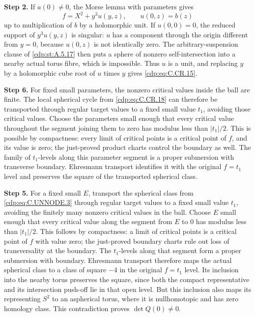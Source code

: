 \noindent\textbf{Step 2.} If $a(0)\ne0$, the Morse lemma with parameters gives
\[
 f=X^2+y^3u(y,z),\qquad u(0,z)=b(z)
\]
up to multiplication of $b$ by a holomorphic unit.
If $u(0,0)=0$, the reduced support of $y^3u(y,z)$ is
singular: $u$ has a component through the origin
different from $y=0$, because $u(0,z)$ is not identically
zero. The arbitrary-suspension clause of \ref{cdp:st:A.5.17} then
puts a sphere of nonzero self-intersection into a
nearby actual torus fibre, which is impossible.
Thus $u$ is a unit, and replacing $y$ by a holomorphic
cube root of $u$ times $y$ gives \eqref{cdp:eq:C.CR.15}.



\noindent\textbf{Step 6.} For fixed small parameters, the nonzero critical
values inside the ball are finite. The local
spherical cycle from \eqref{cdp:eq:C.CR.18} can therefore be transported
through regular target values to a fixed small
value $t_1$, avoiding those critical values.
Choose the parameters small enough that every
critical value throughout the segment joining
them to zero has modulus less than $|t_1|/2$.
This is possible by compactness: every limit of
critical points is a critical point of $f$, and
its value is zero; the just-proved product charts
control the boundary as well. The family of
$t_1$-levels along this parameter segment is a
proper submersion with transverse boundary.
Ehresmann transport identifies it with the
original $f=t_1$ level and preserves the square
of the transported spherical class.



\noindent\textbf{Step 5.} For a fixed small $E$, transport the spherical
class from \eqref{cdp:eq:C.UNNODE.3} through regular target values
to a fixed small value $t_1$, avoiding the finitely
many nonzero critical values in the ball. Choose
$E$ small enough that every critical value along
the segment from $E$ to $0$ has modulus less than
$|t_1|/2$. This follows by compactness: a limit of
critical points is a critical point of $f$ with
value zero; the just-proved boundary charts rule
out loss of transversality at the boundary.
The $t_1$-levels along that segment form a proper
submersion with boundary. Ehresmann transport
therefore maps the actual spherical class to a
class of square $-4$ in the original $f=t_1$ level.
Its inclusion into the nearby torus preserves
the square, since both the compact representative
and its intersection push-off lie in that open
level. But this inclusion also maps its representing
$S^2$ to an aspherical torus, where it is
nullhomotopic and has zero homology class. This
contradiction proves $\det Q(0)\ne0$.

